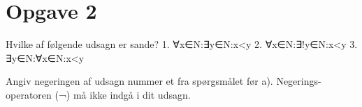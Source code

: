 \section{Opgave 2}

Hvilke af følgende udsagn er sande?
1. ∀x∈N:∃y∈N:x<y 
2. ∀x∈N:∃!y∈N:x<y 
3. ∃y∈N:∀x∈N:x<y

Angiv negeringen af udsagn nummer et fra spørgsmålet før
a). Negerings-operatoren (¬) må ikke indgå i dit udsagn.